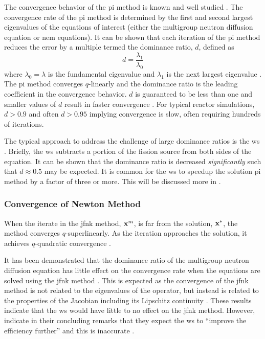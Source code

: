       The convergence behavior of the \gls{pi} method is known and well studied 
      \cite{nakamura,gehinThesis,my_ms_thesis}. The convergence rate of the
      \gls{pi} method is determined by the first and second largest eigenvalues
      of the equations of interest (either the multigroup neutron diffusion
      equation or \gls{nem} equations). It can be shown that each iteration of
      the \gls{pi} method reduces the error by a multiple termed the dominance
      ratio, $d$, defined as
      \begin{equation}
        \label{eq:dominance_ratio}
        d = \frac{\lambda_1}{\lambda_0}
      \end{equation}
      where $\lambda_0 = \lambda$ is the fundamental eigenvalue and $\lambda_1$
      is the next largest eigenvalue \cite{my_ms_thesis}. The \gls{pi} method
      converges $q$-linearly and the dominance ratio is the leading coefficient
      in the convergence behavior. $d$ is guaranteed to be less than one and
      smaller values of $d$ result in faster convergence \cite{nakamura}. For
      typical reactor simulations, $d > 0.9$ and often $d > 0.95$ implying
      convergence is slow, often requiring hundreds of iterations.

      The typical approach to address the challenge of large dominance ratios is
      the \gls{ws} \cite{gehinThesis}. Briefly, the \gls{ws} subtracts a portion
      of the fission source from both sides of the equation. It can be shown
      that the dominance ratio is decreased \textit{significantly} such that $d
      \approx 0.5$ may be expected. It is common for the \gls{ws} to speedup 
      the solution \gls{pi} method by a factor of three or more. This will be
      discussed more in .

    \subsubsection{Convergence of Newton Method}

      When the iterate in the \gls{jfnk} method, $\mathbf{x}^m$, is far from the
      solution, $\mathbf{x}^*$, the method converges $q$-superlinearly. As the
      iteration approaches the solution, it achieves $q$-quadratic convergence
      \cite{textbookkelley}.

      It has been demonstrated that the dominance ratio of the multigroup
      neutron diffusion equation has little effect on the convergence rate when
      the equations are solved using the \gls{jfnk} method \cite{gill_azmy}.
      This is expected as the convergence of the \gls{jfnk} method is not
      related to the eigenvalues of the operator, but instead is related to the
      properties of the Jacobian including its Lipschitz continuity
      \cite{textbookkelley}. These results indicate that the \gls{ws} would have
      little to no effect on the \gls{jfnk} method. However,
      \citeauthor{qe2paper} indicate in their concluding remarks that they
      expect the \gls{ws} to ``improve the efficiency further'' and this is
      inaccurate \cite{qe2paper}.
      
